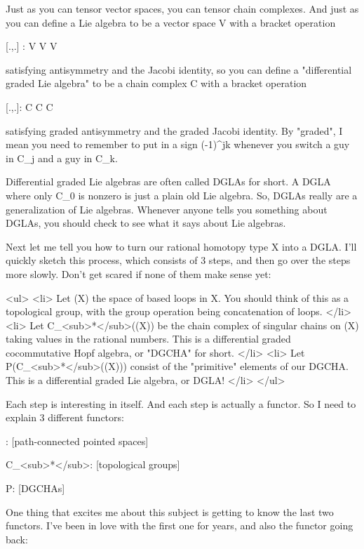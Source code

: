 Just as you can tensor vector spaces, you can tensor chain complexes.
And just as you can define a Lie algebra to be a vector space V with
a bracket operation

[.,.] : V \otimes  V \to  V

satisfying antisymmetry and the Jacobi identity, so you can define a
"differential graded Lie algebra" to be a chain complex C with a
bracket operation

[.,.]: C \otimes  C \to  C

satisfying graded antisymmetry and the graded Jacobi identity.  By
"graded", I mean you need to remember to put in a sign
(-1)^{jk} whenever you switch a guy in C_{j} and a guy in 
C_{k}.

Differential graded Lie algebras are often called DGLAs for short.  A
DGLA where only C_{0} is nonzero is just a plain old Lie
algebra.  So, DGLAs really are a generalization of Lie algebras.
Whenever anyone tells you something about DGLAs, you should check to
see what it says about Lie algebras.

Next let me tell you how to turn our rational homotopy type X into a
DGLA.  I'll quickly sketch this process, which consists of 3 steps,
and then go over the steps more slowly.  Don't get scared if none
of them make sense yet:

<ul>
<li>
 Let \Omega (X) the space of based loops in X.  You should think 
 of this as a topological group, with the group operation being 
 concatenation of loops.  
</li>
<li>
 Let C_{<sub>*}</sub>(\Omega (X)) be the chain complex of
 singular chains on \Omega (X) taking values in the rational numbers.
 This is a differential graded cocommutative Hopf algebra, or
 "DGCHA" for short.
</li>
<li>
 Let P(C_{<sub>*}</sub>(\Omega (X))) consist of the
 "primitive" elements of our DGCHA.  This is a differential
 graded Lie algebra, or DGLA!  
</li> 
</ul>

Each step is interesting in itself.  And each step is actually a
functor.  So I need to explain 3 different functors:

\Omega : [path-connected pointed spaces] 

C_{<sub>*}</sub>: [topological groups] \to  [DGCHAs]

P: [DGCHAs] \to  [DGLAs]

One thing that excites me about this subject is getting to know the
last two functors.  I've been in love with the first one for years,
and also the functor going back:

